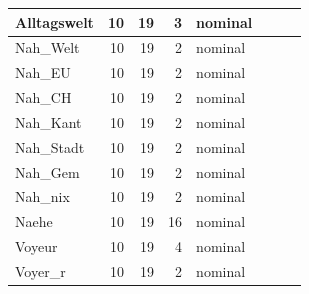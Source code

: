 \documentclass[twoside, pagesize, fontsize=11pt, dvipsnames]{scrreport}
\begin{document}
\begin{table}
\begin{tabular}[t]{l|r|r|r|l|>{}r|>{}r|>{}r}
\hline
Alltagswelt & 10 & 19 & 3 & nominal & \cellcolor[HTML]{9B0F01}{\textcolor{white}{0.05}} & \cellcolor[HTML]{92FF47}{\textcolor{black}{0.79}} & \cellcolor[HTML]{B9F635}{\textcolor{black}{0.69}}\\
\hline
Nah\_Welt & 10 & 19 & 2 & nominal & \cellcolor[HTML]{E5D938}{\textcolor{black}{0.40}} & \cellcolor[HTML]{1FC9DD}{\textcolor{black}{0.88}} & \cellcolor[HTML]{43F787}{\textcolor{black}{0.77}}\\
\hline
Nah\_EU & 10 & 19 & 2 & nominal & \cellcolor[HTML]{22EBAA}{\textcolor{black}{0.65}} & \cellcolor[HTML]{4682F8}{\textcolor{white}{0.93}} & \cellcolor[HTML]{2CB7F0}{\textcolor{black}{0.86}}\\
\hline
Nah\_CH & 10 & 19 & 2 & nominal & \cellcolor[HTML]{D9E436}{\textcolor{black}{0.42}} & \cellcolor[HTML]{2AEFA1}{\textcolor{black}{0.84}} & \cellcolor[HTML]{C6F034}{\textcolor{black}{0.68}}\\
\hline
Nah\_Kant & 10 & 19 & 2 & nominal & \cellcolor[HTML]{EECF3A}{\textcolor{black}{0.38}} & \cellcolor[HTML]{1FC9DD}{\textcolor{black}{0.88}} & \cellcolor[HTML]{55FA76}{\textcolor{black}{0.76}}\\
\hline
Nah\_Stadt & 10 & 19 & 2 & nominal & \cellcolor[HTML]{CDEC34}{\textcolor{black}{0.44}} & \cellcolor[HTML]{18DEC0}{\textcolor{black}{0.86}} & \cellcolor[HTML]{88FF4E}{\textcolor{black}{0.73}}\\
\hline
Nah\_Gem & 10 & 19 & 2 & nominal & \cellcolor[HTML]{FDAE35}{\textcolor{black}{0.32}} & \cellcolor[HTML]{4682F8}{\textcolor{white}{0.93}} & \cellcolor[HTML]{25C0E7}{\textcolor{black}{0.85}}\\
\hline
Nah\_nix & 10 & 19 & 2 & nominal & \cellcolor[HTML]{A91601}{\textcolor{white}{0.07}} & \cellcolor[HTML]{4143A7}{\textcolor{white}{0.97}} & \cellcolor[HTML]{4451BF}{\textcolor{white}{0.95}}\\
\hline
Naehe & 10 & 19 & 16 & nominal & \cellcolor[HTML]{E5D938}{\textcolor{black}{0.40}} & \cellcolor[HTML]{F76F1A}{\textcolor{black}{0.66}} & \cellcolor[HTML]{EBD339}{\textcolor{black}{0.64}}\\
\hline
Voyeur & 10 & 19 & 4 & nominal & \cellcolor[HTML]{FEA130}{\textcolor{white}{0.30}} & \cellcolor[HTML]{FEA130}{\textcolor{black}{0.69}} & \cellcolor[HTML]{FEA130}{\textcolor{white}{0.59}}\\
\hline
Voyer\_r & 10 & 19 & 2 & nominal & \cellcolor[HTML]{FEA732}{\textcolor{black}{0.31}} & \cellcolor[HTML]{A4FC3C}{\textcolor{black}{0.78}} & \cellcolor[HTML]{FA7B1F}{\textcolor{white}{0.56}}\\

\end{tabular}
\end{table}
\end{document}
